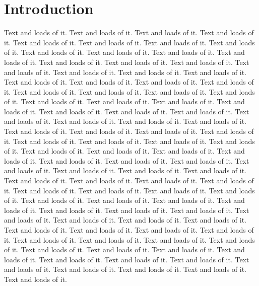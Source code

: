 \documentclass{exampaper}
\begin{document}
\maketitle

\section{Introduction}
Text and loads of it.  Text and loads of it.  Text and loads of it.  Text and loads of it.  Text and loads of it.  Text and loads of it.  Text and loads of it.  Text and loads of it.  Text and loads of it.  Text and loads of it.  Text and loads of it.  Text and loads of it.  Text and loads of it.  Text and loads of it.  Text and loads of it.  Text and loads of it.  Text and loads of it.  Text and loads of it.  Text and loads of it.  Text and loads of it.  Text and loads of it.  Text and loads of it.  Text and loads of it.  Text and loads of it.  Text and loads of it.  Text and loads of it.  Text and loads of it.  Text and loads of it.  Text and loads of it.  Text and loads of it.  Text and loads of it.  Text and loads of it.  Text and loads of it.  Text and loads of it.  Text and loads of it.  Text and loads of it.  Text and loads of it.  Text and loads of it.  Text and loads of it.  Text and loads of it.  Text and loads of it.  Text and loads of it.  Text and loads of it.  Text and loads of it.  Text and loads of it.  Text and loads of it.  Text and loads of it.  Text and loads of it. 
Text and loads of it.  Text and loads of it.  Text and loads of it.  Text and loads of it.  Text and loads of it.  Text and loads of it.  Text and loads of it.  Text and loads of it.  Text and loads of it.  Text and loads of it.  Text and loads of it.  Text and loads of it.  Text and loads of it.  Text and loads of it.  Text and loads of it.  Text and loads of it.  Text and loads of it.  Text and loads of it.  Text and loads of it.  Text and loads of it.  Text and loads of it.  Text and loads of it.  Text and loads of it.  Text and loads of it.  Text and loads of it.  Text and loads of it.  Text and loads of it.  Text and loads of it.  Text and loads of it.  Text and loads of it.  Text and loads of it.  Text and loads of it.  Text and loads of it.  Text and loads of it.  Text and loads of it.  Text and loads of it.  Text and loads of it.  Text and loads of it.  Text and loads of it.  Text and loads of it.  Text and loads of it.  Text and loads of it.  Text and loads of it.  Text and loads of it.  Text and loads of it.  Text and loads of it.  Text and loads of it.  Text and loads of it. 
\end{document}
